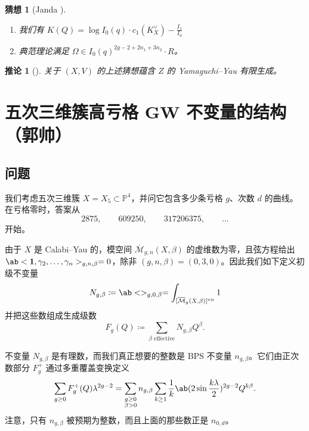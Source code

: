 \documentclass{amsart}
\newtheorem{cor}[thm]{推论}
\newtheorem{conj}[thm]{猜想}
\theoremstyle{definition}
\theoremstyle{remark}
\theoremstyle{plain}
\theoremstyle{definition}
\theoremstyle{remark}
\renewcommand{\P}{\mathbb{P}}
\newcommand{\Mbar}{\overline{\mathcal{M}}}
\newcommand{\mr}[1]{\mathrm{#1}}
\newcommand{\1}{\mathbf{1}}
\newcommand{\2}{\mathbf{2}}
\newcommand{\3}{\mathbf{3}}
\newcommand{\vir}{\mr{vir}}
\begin{document}
\begin{conj}[Janda {\cite[Conjecture~1.6]{CJRtropical2025}}]\leavevmode
    \begin{enumerate}
        \item 我们有 \(K(Q) = \log I_0(q) \cdot c_1(K_X^{\vee}) - \frac{I_1}{I_0}\) \\
        \item 典范理论满足 \(\Omega \in I_0(q)^{2g-2+2n_1 + 3 n_2} \cdot R\)。
    \end{enumerate}
\end{conj}

\begin{cor}[{\cite[Theorem~1.7]{CJRtropical2025}}]
    关于 \((X, V)\) 的上述猜想蕴含 \(Z\) 的 Yamaguchi–Yau 有限生成。
\end{cor}


\section{五次三维簇高亏格 GW 不变量的结构（郭帅）}%
\label{sec:Structure of higher-genus GW invariants of the quintic (Shuai Guo)}

\subsection{问题}%
\label{sub:The problem (Guo)}

我们考虑五次三维簇 \(X = X_5 \subset \P^4\)，并问它包含多少条亏格 \(g\)、次数 \(d\) 的曲线。在亏格零时，答案从
\[ 2875, \qquad 609250, \qquad 317206375, \qquad \ldots \]
开始。

由于 \(X\) 是 Calabi–Yau 的，模空间 \(\Mbar_{g,n}(X,\beta)\) 的虚维数为零，且弦方程给出 \(\ab<\1, \gamma_2, \ldots, \gamma_n>_{g,n,\beta} = 0\)，除非 \((g,n,\beta) = (0,3,0)\)。因此我们如下定义初级不变量
\[ N_{g,\beta} \coloneqq \ab<>_{g,0,\beta} = \int_{[\Mbar_g(X,\beta)]^{\vir}} 1 \]
并把这些数组成生成级数
\[ F_g(Q) \coloneqq \sum_{\beta \text{ effective}} N_{g,\beta}Q^{\beta}. \]

不变量 \(N_{g,\beta}\) 是有理数，而我们真正想要的整数是 BPS 不变量 \(n_{g,\beta}\)。它们由正次数部分 \(F_g^+\) 通过多重覆盖变换定义
\[ \sum_{g \geq 0} F_g^+(Q)\lambda^{2g-2} = \sum_{\substack{g \geq 0 \\ \beta > 0}} n_{g,\beta} \sum_{k \geq 1} \frac{1}{k} \ab(2 \sin \frac{k\lambda}{2})^{2g-2}Q^{k\beta}. \]
注意，只有 \(n_{g,\beta}\) 被预期为整数，而且上面的那些数正是 \(n_{0,d}\)。
\end{document}
